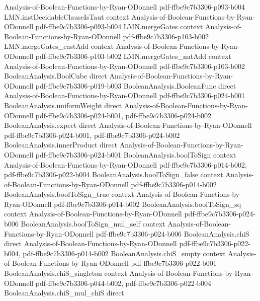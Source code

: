 \begin{lemma}
  {Analysis-of-Boolean-Functions-by-Ryan-ODonnell}
  {pdf-ffbe9c7b3306-p093-b004}
\proofstep
  {LMN.instDecidableClauseIsTaut}
  {context}
  {Analysis-of-Boolean-Functions-by-Ryan-ODonnell}
  {pdf-ffbe9c7b3306-p093-b004}
\proofstep
  {LMN.mergeGates}
  {context}
  {Analysis-of-Boolean-Functions-by-Ryan-ODonnell}
  {pdf-ffbe9c7b3306-p103-b002}
\proofstep
  {LMN.mergeGates_castAdd}
  {context}
  {Analysis-of-Boolean-Functions-by-Ryan-ODonnell}
  {pdf-ffbe9c7b3306-p103-b002}
\proofstep
  {LMN.mergeGates_natAdd}
  {context}
  {Analysis-of-Boolean-Functions-by-Ryan-ODonnell}
  {pdf-ffbe9c7b3306-p103-b002}
\proofstep
  {BooleanAnalysis.BoolCube}
  {direct}
  {Analysis-of-Boolean-Functions-by-Ryan-ODonnell}
  {pdf-ffbe9c7b3306-p019-b003}
\proofstep
  {BooleanAnalysis.BooleanFunc}
  {direct}
  {Analysis-of-Boolean-Functions-by-Ryan-ODonnell}
  {pdf-ffbe9c7b3306-p024-b001}
\proofstep
  {BooleanAnalysis.uniformWeight}
  {direct}
  {Analysis-of-Boolean-Functions-by-Ryan-ODonnell}
  {pdf-ffbe9c7b3306-p024-b001,
    pdf-ffbe9c7b3306-p024-b002}
\proofstep
  {BooleanAnalysis.expect}
  {direct}
  {Analysis-of-Boolean-Functions-by-Ryan-ODonnell}
  {pdf-ffbe9c7b3306-p024-b001,
    pdf-ffbe9c7b3306-p024-b002}
\proofstep
  {BooleanAnalysis.innerProduct}
  {direct}
  {Analysis-of-Boolean-Functions-by-Ryan-ODonnell}
  {pdf-ffbe9c7b3306-p024-b001}
\proofstep
  {BooleanAnalysis.boolToSign}
  {context}
  {Analysis-of-Boolean-Functions-by-Ryan-ODonnell}
  {pdf-ffbe9c7b3306-p014-b002,
    pdf-ffbe9c7b3306-p022-b004}
\proofstep
  {BooleanAnalysis.boolToSign_false}
  {context}
  {Analysis-of-Boolean-Functions-by-Ryan-ODonnell}
  {pdf-ffbe9c7b3306-p014-b002}
\proofstep
  {BooleanAnalysis.boolToSign_true}
  {context}
  {Analysis-of-Boolean-Functions-by-Ryan-ODonnell}
  {pdf-ffbe9c7b3306-p014-b002}
\proofstep
  {BooleanAnalysis.boolToSign_sq}
  {context}
  {Analysis-of-Boolean-Functions-by-Ryan-ODonnell}
  {pdf-ffbe9c7b3306-p024-b006}
\proofstep
  {BooleanAnalysis.boolToSign_mul_self}
  {context}
  {Analysis-of-Boolean-Functions-by-Ryan-ODonnell}
  {pdf-ffbe9c7b3306-p024-b006}
\proofstep
  {BooleanAnalysis.chiS}
  {direct}
  {Analysis-of-Boolean-Functions-by-Ryan-ODonnell}
  {pdf-ffbe9c7b3306-p022-b004,
    pdf-ffbe9c7b3306-p014-b002}
\proofstep
  {BooleanAnalysis.chiS_empty}
  {context}
  {Analysis-of-Boolean-Functions-by-Ryan-ODonnell}
  {pdf-ffbe9c7b3306-p022-b001}
\proofstep
  {BooleanAnalysis.chiS_singleton}
  {context}
  {Analysis-of-Boolean-Functions-by-Ryan-ODonnell}
  {pdf-ffbe9c7b3306-p044-b002,
    pdf-ffbe9c7b3306-p022-b004}
\proofstep
  {BooleanAnalysis.chiS_mul_chiS}
  {direct}

\end{lemma}
